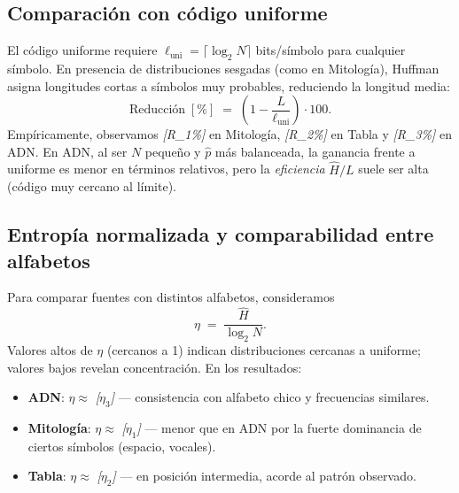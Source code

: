 \documentclass[12pt, a4paper]{article}
\begin{document}
\subsection*{Comparación con código uniforme}
El código uniforme requiere $\ell_{\text{uni}}=\lceil\log_2 N\rceil$ bits/símbolo para cualquier símbolo. En presencia de distribuciones sesgadas (como en Mitología), Huffman asigna longitudes cortas a símbolos muy probables, reduciendo la longitud media:
\[
\text{Reducción}\;[\%] \;=\; \left(1-\frac{L}{\ell_{\text{uni}}}\right)\cdot 100.
\]
Empíricamente, observamos \emph{[R\_1\%]} en Mitología, \emph{[R\_2\%]} en Tabla y \emph{[R\_3\%]} en ADN. 
En ADN, al ser $N$ pequeño y $\hat p$ más balanceada, la ganancia frente a uniforme es menor en términos relativos, pero la \emph{eficiencia} $\hat H/L$ suele ser alta (código muy cercano al límite).

\subsection*{Entropía normalizada y comparabilidad entre alfabetos}
Para comparar fuentes con distintos alfabetos, consideramos
\[
\eta \;=\; \frac{\hat H}{\log_2 N}.
\]
Valores altos de $\eta$ (cercanos a 1) indican distribuciones cercanas a uniforme; valores bajos revelan concentración. En los resultados:
\begin{itemize}
  \item \textbf{ADN}: $\eta \approx$ \emph{[$\eta_3$]} — consistencia con alfabeto chico y frecuencias similares.
  \item \textbf{Mitología}: $\eta \approx$ \emph{[$\eta_1$]} — menor que en ADN por la fuerte dominancia de ciertos símbolos (espacio, vocales).
  \item \textbf{Tabla}: $\eta \approx$ \emph{[$\eta_2$]} — en posición intermedia, acorde al patrón observado.
\end{itemize}
\end{document}

